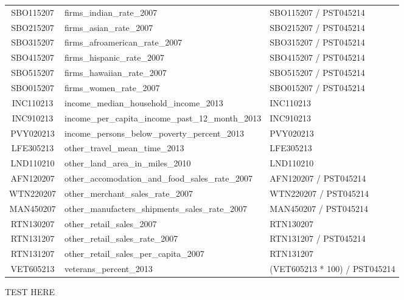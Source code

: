 \begin{landscape}
{\begin{tabularx}{\linewidth}[H]{@{}cXX@{}}
	SBO115207           & firms\_indian\_rate\_2007                         & SBO115207 / PST045214         \\
	SBO215207           & firms\_asian\_rate\_2007                          & SBO215207 / PST045214         \\
	SBO315207           & firms\_afroamerican\_rate\_2007                   & SBO315207 / PST045214         \\
	SBO415207           & firms\_hispanic\_rate\_2007                       & SBO415207 / PST045214         \\
	SBO515207           & firms\_hawaiian\_rate\_2007                       & SBO515207 / PST045214         \\
	SBO015207           & firms\_women\_rate\_2007                          & SBO015207 / PST045214         \\
	INC110213           & income\_median\_household\_income\_2013            & INC110213                     \\
	INC910213           & income\_per\_capita\_income\_past\_12\_month\_2013    & INC910213                     \\
	PVY020213           & income\_persons\_below\_poverty\_percent\_2013      & PVY020213                     \\
	LFE305213           & other\_travel\_mean\_time\_2013                    & LFE305213                     \\
	LND110210           & other\_land\_area\_in\_miles\_2010                  & LND110210                     \\
	AFN120207           & other\_accomodation\_and\_food\_sales\_rate\_2007    & AFN120207 / PST045214         \\
	WTN220207           & other\_merchant\_sales\_rate\_2007                 & WTN220207 / PST045214         \\
	MAN450207           & other\_manufacters\_shipments\_sales\_rate\_2007    & MAN450207 / PST045214         \\
	RTN130207           & other\_retail\_sales\_2007                        & RTN130207                     \\
	RTN131207           & other\_retail\_sales\_rate\_2007                   & RTN131207 / PST045214         \\
	RTN131207           & other\_retail\_sales\_per\_capita\_2007             & RTN131207                     \\
	VET605213           & veterans\_percent\_2013                          & (VET605213 * 100) / PST045214 \\
	\bottomrule
\end{tabularx}
}
\end{landscape}

\pagestyle{headings}
TEST HERE